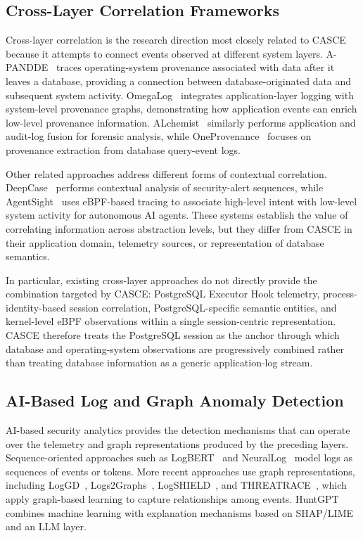 \documentclass[conference]{IEEEtran}
\begin{document}
\subsection{Cross-Layer Correlation Frameworks}

Cross-layer correlation is the research direction most closely related to CASCE because it attempts to connect events observed at different system layers. A-PANDDE~\cite{apandde} traces operating-system provenance associated with data after it leaves a database, providing a connection between database-originated data and subsequent system activity. OmegaLog~\cite{omegalog} integrates application-layer logging with system-level provenance graphs, demonstrating how application events can enrich low-level provenance information. ALchemist~\cite{alchemist} similarly performs application and audit-log fusion for forensic analysis, while OneProvenance~\cite{oneprovenance} focuses on provenance extraction from database query-event logs.

Other related approaches address different forms of contextual correlation. DeepCase~\cite{deepcase} performs contextual analysis of security-alert sequences, while AgentSight~\cite{agentsight} uses eBPF-based tracing to associate high-level intent with low-level system activity for autonomous AI agents. These systems establish the value of correlating information across abstraction levels, but they differ from CASCE in their application domain, telemetry sources, or representation of database semantics.

In particular, existing cross-layer approaches do not directly provide the combination targeted by CASCE: PostgreSQL Executor Hook telemetry, process-identity-based session correlation, PostgreSQL-specific semantic entities, and kernel-level eBPF observations within a single session-centric representation. CASCE therefore treats the PostgreSQL session as the anchor through which database and operating-system observations are progressively combined rather than treating database information as a generic application-log stream.

\subsection{AI-Based Log and Graph Anomaly Detection}

AI-based security analytics provides the detection mechanisms that can operate over the telemetry and graph representations produced by the preceding layers. Sequence-oriented approaches such as LogBERT~\cite{logbert} and NeuralLog~\cite{neurallog} model logs as sequences of events or tokens. More recent approaches use graph representations, including LogGD~\cite{loggd}, Logs2Graphs~\cite{logs2graphs}, LogSHIELD~\cite{logshield}, and THREATRACE~\cite{threatrace}, which apply graph-based learning to capture relationships among events. HuntGPT~\cite{huntgpt} combines machine learning with explanation mechanisms based on SHAP/LIME and an LLM layer.
\end{document}
